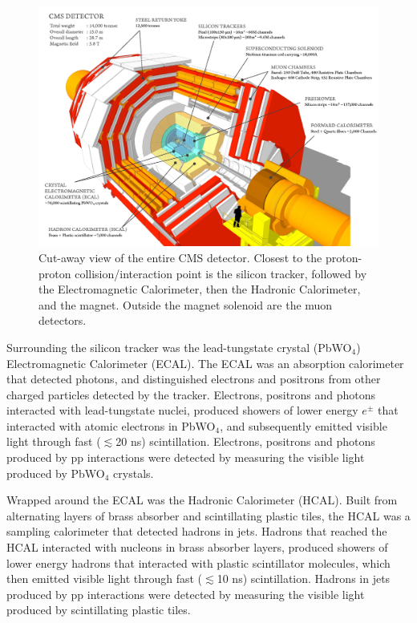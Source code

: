 \begin{figure}[h]
	\centering
	\includegraphics[width=1\textwidth]{figures/cmsDetectorBasic.png}
	\caption{Cut-away view of the entire CMS detector.  Closest to the proton-proton collision/interaction point is the 
		silicon tracker, followed by the Electromagnetic Calorimeter, then the Hadronic Calorimeter, and the 
	magnet.  Outside the magnet solenoid are the muon detectors.}
	\label{fig:layersOfCMS}
\end{figure}


Surrounding the silicon tracker was the lead-tungstate crystal (PbWO$_{4}$) Electromagnetic Calorimeter (ECAL).  
The ECAL was an absorption calorimeter that detected photons, and distinguished electrons and positrons from other charged 
particles detected by the tracker.  Electrons, positrons and photons interacted with lead-tungstate nuclei, 
produced showers of lower energy $e^{\pm}$ that interacted with atomic electrons in PbWO$_{4}$, and subsequently 
emitted visible light through fast ($\lesssim$20 ns) scintillation.  Electrons, positrons and photons produced 
by pp interactions were detected by measuring the visible light produced by PbWO$_{4}$ crystals.

Wrapped around the ECAL was the Hadronic Calorimeter (HCAL).  Built from alternating layers of brass absorber and 
scintillating plastic tiles, the HCAL was a sampling calorimeter that detected hadrons in jets.  Hadrons that 
reached the HCAL interacted with nucleons in brass absorber layers, produced showers of 
lower energy hadrons that interacted with plastic scintillator molecules, which then emitted visible light through 
fast ($\lesssim$10 ns) scintillation.  Hadrons in jets produced by pp interactions were detected by measuring the 
visible light produced by scintillating plastic tiles.

